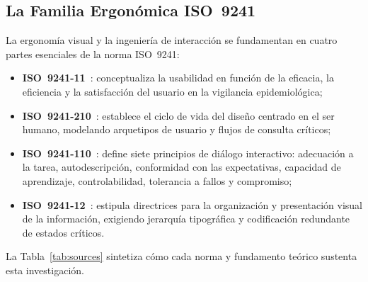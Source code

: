 \documentclass[conference]{IEEEtran}
\begin{document}
\subsection{La Familia Ergon\'omica ISO~9241}

La ergonom\'ia visual y la ingenier\'ia de interacci\'on se fundamentan en cuatro partes esenciales de la norma ISO~9241:
\begin{itemize}
  \item \textbf{ISO~9241-11}~\cite{ISO9241-11}: conceptualiza la usabilidad en funci\'on de la eficacia, la eficiencia y la satisfacci\'on del usuario en la vigilancia epidemiol\'ogica;
  \item \textbf{ISO~9241-210}~\cite{ISO9241-210}: establece el ciclo de vida del dise\~no centrado en el ser humano, modelando arquetipos de usuario y flujos de consulta cr\'iticos;
  \item \textbf{ISO~9241-110}~\cite{ISO9241-110}: define siete principios de di\'alogo interactivo: adecuaci\'on a la tarea, autodescripci\'on, conformidad con las expectativas, capacidad de aprendizaje, controlabilidad, tolerancia a fallos y compromiso;
  \item \textbf{ISO~9241-12}~\cite{ISO9241-12}: estipula directrices para la organizaci\'on y presentaci\'on visual de la informaci\'on, exigiendo jerarqu\'ia tipogr\'afica y codificaci\'on redundante de estados cr\'iticos.
\end{itemize}

La Tabla~\ref{tab:sources} sintetiza c\'omo cada norma y fundamento te\'orico sustenta esta investigaci\'on.
\end{document}
